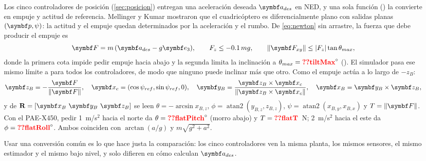 Los cinco controladores de posición (\cref{sec:posicion}) entregan una
aceleración deseada $\vect a_{des}$ en NED, y una sola función
() la convierte en empuje y actitud de
referencia. Mellinger y Kumar \cite{mellinger11} mostraron que el
cuadricóptero es diferencialmente plano con salidas planas $(\vect p,\psi)$:
la actitud y el empuje quedan determinados por la aceleración y el rumbo.
De \eqref{eq:newton} sin arrastre, la fuerza que debe producir el empuje es
\begin{equation}
\vect F=m\,(\vect a_{des}-g\eu),\qquad F_z\le-0.1\,mg,
\qquad \|\vect F_{xy}\|\le|F_z|\tan\theta_{max},
\label{eq:flatF}
\end{equation}
donde la primera cota impide pedir empuje hacia abajo y la segunda limita
la inclinación a $\theta_{max}=\val{tiltMax}^\circ$
(). El simulador pasa ese mismo límite a
 para todos los controladores, de modo que
ninguno puede inclinar más que otro. Como el empuje actúa a lo largo de $-z_B$:
\begin{equation}
\vect z_B=-\frac{\vect F}{\|\vect F\|},\quad
\vect x_c=(\cos\psi_{ref},\sin\psi_{ref},0),\quad
\vect y_B=\frac{\vect z_B\times\vect x_c}{\|\vect z_B\times\vect x_c\|},\quad
\vect x_B=\vect y_B\times\vect z_B,
\label{eq:flatR}
\end{equation}
y de $\R=[\vect x_B\ \vect y_B\ \vect z_B]$ se leen
$\theta=-\arcsin x_{B,z}$, $\phi=\operatorname{atan2}(y_{B,z},z_{B,z})$,
$\psi=\operatorname{atan2}(x_{B,y},x_{B,x})$ y $T=\|\vect F\|$. Con el
PAE-X450, pedir 1~m/s$^2$ hacia el norte da $\theta=\val{flatPitch}^\circ$
(morro abajo) y $T=\val{flatT}$~N; 2~m/s$^2$ hacia el este da
$\phi=\val{flatRoll}^\circ$. Ambos coinciden con
$\arctan(a/g)$ y $m\sqrt{g^2+a^2}$.

Usar una conversión común es lo que hace justa la comparación: los cinco
controladores ven la misma planta, los mismos sensores, el mismo estimador y
el mismo bajo nivel, y solo difieren en cómo calculan $\vect a_{des}$.
